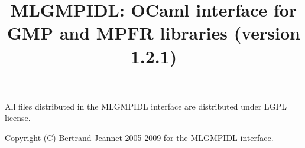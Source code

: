 \documentclass[[twoside,10pt,a4paper]{report}
\title{MLGMPIDL: OCaml interface for GMP and MPFR libraries (version 1.2.1)}
\begin{document}
\maketitle

\vspace*{0.9\textheight}

All files distributed in the MLGMPIDL interface are
distributed under LGPL license.

Copyright (C) Bertrand Jeannet 2005-2009 for the MLGMPIDL
interface.

\newpage

\tableofcontents



\appendix
\printindex
\end{document}
